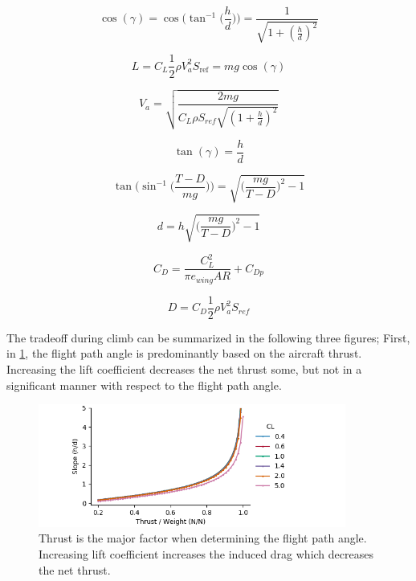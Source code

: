 \documentclass[10pt,english]{article}
\begin{document}
\begin{equation}
\label{e:h_l}
\cos(\gamma) = \cos \Bigg(\tan^{-1}\bigg(\frac{h}{d}\bigg)\Bigg) = \frac{1}{\sqrt{1+(\frac{h}{d})^2}}
\end{equation}

\begin{equation}
\label{e:L}
L = C_L \frac{1}{2} \rho V_a^2 S_{\text{ref}} = m g \cos(\gamma)
\end{equation}

\begin{equation}
\label{e:Va}
V_a = \sqrt{\frac{2 m g}{C_L \rho S_{ref} \sqrt{(1+\frac{h}{d})^2}}}
\end{equation}

\begin{equation}
\label{e:d0}
\tan(\gamma) = \frac{h}{d} 
\end{equation}

\begin{equation}
\label{e:d1}
\tan \Bigg(\sin^{-1}\Bigg(\frac{T-D}{mg}\Bigg)\Bigg) = \sqrt{\bigg(\frac{m g}{T-D}\bigg)^2-1}
\end{equation}

\begin{equation}
\label{e:d}
d = h \sqrt{\bigg(\frac{m g}{T-D}\bigg)^2-1}
\end{equation}

\begin{equation}
\label{e:CD}
C_D = \frac{C_L^2}{\pi e_{wing} AR} + C_{Dp}
\end{equation}

\begin{equation}
\label{e:D}
D = C_D \frac{1}{2} \rho V_a^2 S_{ref}
\end{equation}

The tradeoff during climb can be summarized in the following three figures;  First, in \cref{f:TW_analytical}, the flight path angle is predominantly based on the aircraft thrust.  Increasing the lift coefficient decreases the net thrust some, but not in a significant manner with respect to the flight path angle.

\begin{figure}[H]
\centering
\includegraphics[trim={.0cm 0.0cm .0cm 0cm},clip,width=0.9\textwidth]{TW_analytical}
\vspace{-5pt}
\caption{Thrust is the major factor when determining the flight path angle.  Increasing lift coefficient increases the induced drag which decreases the net thrust.}
\label{f:TW_analytical}
\end{figure}
\end{document}
